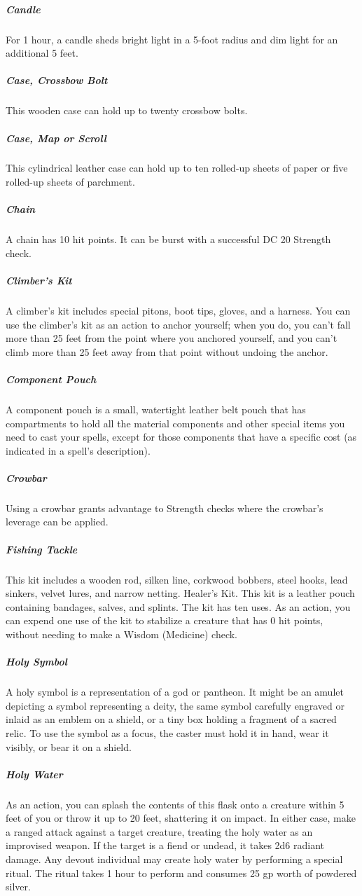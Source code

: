 \subparagraph*{Candle} For 1 hour, a candle sheds bright light in a 5-foot radius and dim light for an additional 5 feet.

\subparagraph*{Case, Crossbow Bolt} This wooden case can hold up to twenty crossbow bolts.

\subparagraph*{Case, Map or Scroll} This cylindrical leather case can hold up to ten rolled-up sheets of paper or five rolled-up sheets of parchment.

\subparagraph*{Chain} A chain has 10 hit points. It can be burst with a successful DC 20 Strength check.

\subparagraph*{Climber's Kit} A climber's kit includes special pitons, boot tips, gloves, and a harness. You can use the climber's kit as an action to anchor yourself; when you do, you can't fall more than 25 feet from the point where you anchored yourself, and you can't climb more than 25 feet away from that point without undoing the anchor.

\subparagraph*{Component Pouch} A component pouch is a small, watertight leather belt pouch that has compartments to hold all the material components and other special items you need to cast your spells, except for those components that have a specific cost (as indicated in a spell's description).
\subparagraph*{Crowbar} Using a crowbar grants advantage to Strength checks where the crowbar's leverage can be applied.


\subparagraph*{Fishing Tackle} This kit includes a wooden rod, silken line, corkwood bobbers, steel hooks, lead sinkers, velvet lures, and narrow netting.
Healer's Kit. This kit is a leather pouch containing bandages, salves, and splints. The kit has ten uses. As an action, you can expend one use of the kit to stabilize a creature that has 0 hit points, without needing to make a Wisdom (Medicine) check.

\subparagraph*{Holy Symbol} A holy symbol is a representation of a god or pantheon. It might be an amulet depicting a symbol representing a deity, the same symbol carefully engraved or inlaid as an emblem on a shield, or a tiny box holding a fragment of a sacred relic. To use the symbol as a focus, the caster must hold it in hand, wear it visibly, or bear it on a shield.

\subparagraph*{Holy Water} As an action, you can splash the contents of this flask onto a creature within 5 feet of you or throw it up to 20 feet, shattering it on impact. In either case, make a ranged attack against a target creature, treating the holy water as an improvised weapon. If the target is a fiend or undead, it takes 2d6 radiant damage.
Any devout individual may create holy water by performing a special ritual. The ritual takes 1 hour to perform and consumes 25 gp worth of powdered silver.

